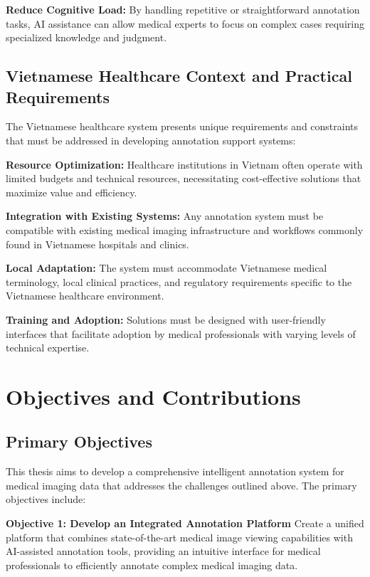 \textbf{Reduce Cognitive Load:} By handling repetitive or straightforward annotation tasks, AI assistance can allow medical experts to focus on complex cases requiring specialized knowledge and judgment.

\subsection{Vietnamese Healthcare Context and Practical Requirements}

The Vietnamese healthcare system presents unique requirements and constraints that must be addressed in developing annotation support systems:

\textbf{Resource Optimization:} Healthcare institutions in Vietnam often operate with limited budgets and technical resources, necessitating cost-effective solutions that maximize value and efficiency.

\textbf{Integration with Existing Systems:} Any annotation system must be compatible with existing medical imaging infrastructure and workflows commonly found in Vietnamese hospitals and clinics.

\textbf{Local Adaptation:} The system must accommodate Vietnamese medical terminology, local clinical practices, and regulatory requirements specific to the Vietnamese healthcare environment.

\textbf{Training and Adoption:} Solutions must be designed with user-friendly interfaces that facilitate adoption by medical professionals with varying levels of technical expertise.

\section{Objectives and Contributions}

\subsection{Primary Objectives}

This thesis aims to develop a comprehensive intelligent annotation system for medical imaging data that addresses the challenges outlined above. The primary objectives include:

\textbf{Objective 1: Develop an Integrated Annotation Platform}
Create a unified platform that combines state-of-the-art medical image viewing capabilities with AI-assisted annotation tools, providing an intuitive interface for medical professionals to efficiently annotate complex medical imaging data.

